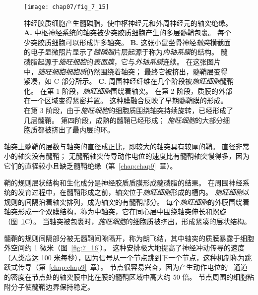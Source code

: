 \begin{figure}[htbp]
	\centering
	\texttt{[image: chap07/fig\_7\_15]}
	\caption{神经胶质细胞产生髓磷脂，使中枢神经元和外周神经元的轴突绝缘。
		\textbf{A.} 中枢神经系统的轴突被少突胶质细胞产生的多层髓鞘包裹。
		每个少突胶质细胞可以形成许多轴突\cite{raine1984morphology}。
		\textbf{B.} 这张小鼠坐骨神经\textit{轴突}横截面的电子显微照片显示了\textit{髓磷脂}片层起源于称为\textit{内轴系膜}的结构。
		髓磷脂起源于\textit{施旺细胞}的\textit{表面膜}，它与\textit{外轴系膜}连续。
		在这张图片中，\textit{施旺细胞细胞质}仍然围绕着轴突；
		最终它被挤出，髓鞘层变得紧凑，如 C 部分所示\cite{thomas1984clinical}。
		\textbf{C.} 周围神经纤维在几个阶段被\textit{施旺细胞}髓鞘化。
		在第 1 阶段，\textit{施旺细胞}围绕着轴突。
		在第 2 阶段，质膜的外部在一个区域变得紧密并置。
		这种膜融合反映了早期髓鞘膜的形成。
		在第 3 阶段，由于\textit{施旺细胞}的细胞质围绕轴突持续旋转，已经形成了几层髓鞘。
		第四阶段，成熟的髓鞘已经形成；
		\textit{施旺细胞}的大部分细胞质都被挤出了最内层的环\cite{williams1989bannister}。}
	\label{fig:7_15}
\end{figure}


轴突上髓鞘的层数与轴突的直径成正比，即较大的轴突具有较厚的鞘。
直径非常小的轴突没有髓鞘；
无髓鞘轴突传导动作电位的速度比有髓鞘轴突慢得多，因为它们的直径较小且缺乏髓鞘绝缘（第~\ref{chap:chap9}~章）。


鞘的规则层状结构和生化成分是神经胶质质膜形成髓磷脂的结果。
在周围神经系统的发育过程中，在髓鞘形成之前，轴突位于\textit{施旺细胞}形成的槽内。
\textit{施旺细胞}以规则的间隔沿着轴突排列，成为轴突的有髓鞘部分。
每个\textit{施旺细胞}的外膜围绕着轴突形成一个双膜结构，称为中轴突，它在同心层中围绕轴突伸长和螺旋（图~\ref{fig:7_15}C）。
当轴突被包裹时，\textit{施旺细胞}的细胞质被挤出，形成紧凑的层状结构。


髓鞘的规则间隔部分被无髓鞘间隙隔开，称为朗飞结，其中轴突的质膜暴露于细胞外空间约 1 微米（图~\ref{fig:7_16}）。 
这种安排极大地提高了神经冲动传导的速度（人类高达 100 米每秒），因为信号从一个节点跳到下一个节点，这种机制称为跳跃式传导（第~\ref{chap:chap9}~章）。 
节点很容易兴奋，因为产生动作电位的~ 通道的密度在节点处的轴突膜中比在膜的髓鞘区域中高大约 50 倍。
节点周围的细胞粘附分子使髓鞘边界保持稳定。


